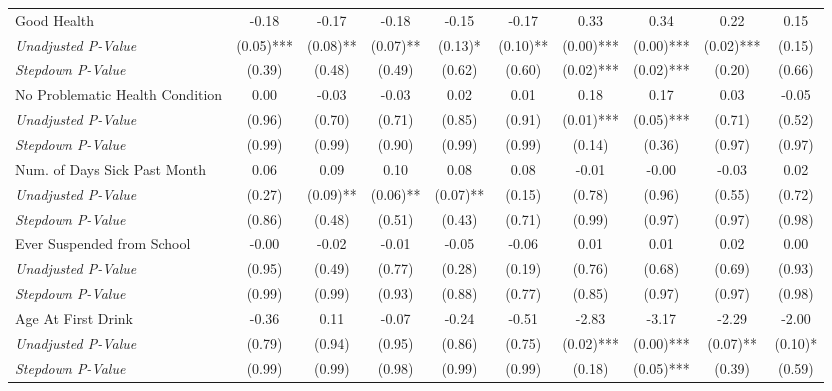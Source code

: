 \begin{tabular}{l c c c c c c c c c}
Good Health & -0.18 & -0.17 & -0.18 & -0.15 & -0.17 & 0.33 & 0.34 & 0.22 & 0.15 \\
\quad \textit{Unadjusted P-Value} & (0.05)*** & (0.08)** & (0.07)** & (0.13)* & (0.10)** & (0.00)*** & (0.00)*** & (0.02)*** & (0.15) \\
\quad \textit{Stepdown P-Value} & (0.39) & (0.48) & (0.49) & (0.62) & (0.60) & (0.02)*** & (0.02)*** & (0.20) & (0.66) \\
No Problematic Health Condition & 0.00 & -0.03 & -0.03 & 0.02 & 0.01 & 0.18 & 0.17 & 0.03 & -0.05 \\
\quad \textit{Unadjusted P-Value} & (0.96) & (0.70) & (0.71) & (0.85) & (0.91) & (0.01)*** & (0.05)*** & (0.71) & (0.52) \\
\quad \textit{Stepdown P-Value} & (0.99) & (0.99) & (0.90) & (0.99) & (0.99) & (0.14) & (0.36) & (0.97) & (0.97) \\
Num. of Days Sick Past Month & 0.06 & 0.09 & 0.10 & 0.08 & 0.08 & -0.01 & -0.00 & -0.03 & 0.02 \\
\quad \textit{Unadjusted P-Value} & (0.27) & (0.09)** & (0.06)** & (0.07)** & (0.15) & (0.78) & (0.96) & (0.55) & (0.72) \\
\quad \textit{Stepdown P-Value} & (0.86) & (0.48) & (0.51) & (0.43) & (0.71) & (0.99) & (0.97) & (0.97) & (0.98) \\
Ever Suspended from School & -0.00 & -0.02 & -0.01 & -0.05 & -0.06 & 0.01 & 0.01 & 0.02 & 0.00 \\
\quad \textit{Unadjusted P-Value} & (0.95) & (0.49) & (0.77) & (0.28) & (0.19) & (0.76) & (0.68) & (0.69) & (0.93) \\
\quad \textit{Stepdown P-Value} & (0.99) & (0.99) & (0.93) & (0.88) & (0.77) & (0.85) & (0.97) & (0.97) & (0.98) \\
Age At First Drink & -0.36 & 0.11 & -0.07 & -0.24 & -0.51 & -2.83 & -3.17 & -2.29 & -2.00 \\
\quad \textit{Unadjusted P-Value} & (0.79) & (0.94) & (0.95) & (0.86) & (0.75) & (0.02)*** & (0.00)*** & (0.07)** & (0.10)* \\
\quad \textit{Stepdown P-Value} & (0.99) & (0.99) & (0.98) & (0.99) & (0.99) & (0.18) & (0.05)*** & (0.39) & (0.59) \\
\bottomrule
\end{tabular}
